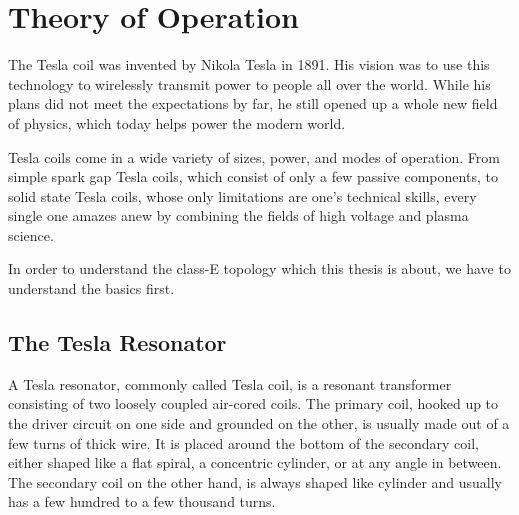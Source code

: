 \chapter{Theory of Operation} %

The Tesla coil was invented by Nikola Tesla in 1891. His vision was to use this technology to wirelessly transmit power to people all over the world. While his plans did not meet the expectations by far, he still opened up a whole new field of physics, which today helps power the modern world.

Tesla coils come in a wide variety of sizes, power, and modes of operation. From simple spark gap Tesla coils, which consist of only a few passive components, to solid state Tesla coils, whose only limitations are one's technical skills, every single one amazes anew by combining the fields of high voltage and plasma science.

In order to understand the class-E topology which this thesis is about, we have to understand the basics first. 

\section{The Tesla Resonator}

A Tesla resonator, commonly called Tesla coil, is a resonant transformer consisting of two loosely coupled air-cored coils. The primary coil, hooked up to the driver circuit on one side and grounded on the other, is usually made out of a few turns of thick wire. It is placed around the bottom of the secondary coil, either shaped like a flat spiral, a concentric cylinder, or at any angle in between. The secondary coil on the other hand, is always shaped like cylinder and usually has a few hundred to a few thousand turns.

